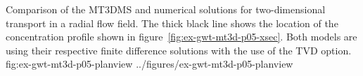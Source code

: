 \begin{StandardFigure}
	{Comparison of the MT3DMS and \mf numerical solutions for two-dimensional transport in a radial flow field.  The thick black line shows the location of the concentration profile shown in figure~\ref{fig:ex-gwt-mt3d-p05-xsec}. Both models are using their respective finite difference solutions with the use of the TVD option.} 
	{fig:ex-gwt-mt3d-p05-planview}
	{../figures/ex-gwt-mt3d-p05-planview}
\end{StandardFigure}
